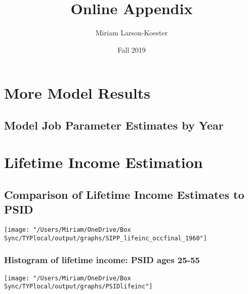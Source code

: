 \documentclass[11pt]{article}
\title{Online Appendix}
\author{Miriam Larson-Koester}
\date{Fall 2019}
\begin{document}
 
\maketitle

\newpage

\section{More Model Results} \label{modelresults}
\subsection{Model Job Parameter Estimates by Year}

\clearpage

\clearpage

\clearpage

\clearpage

\clearpage


\section{Lifetime Income Estimation}
\subsection{Comparison of Lifetime Income Estimates to PSID}

\texttt{[image: "/Users/Miriam/OneDrive/Box Sync/TYPlocal/output/graphs/SIPP\_lifeinc\_occfinal\_1960"]}
\subsubsection{Histogram of lifetime income: PSID ages 25-55}
\texttt{[image: "/Users/Miriam/OneDrive/Box Sync/TYPlocal/output/graphs/PSIDlifeinc"]}
\end{document}

